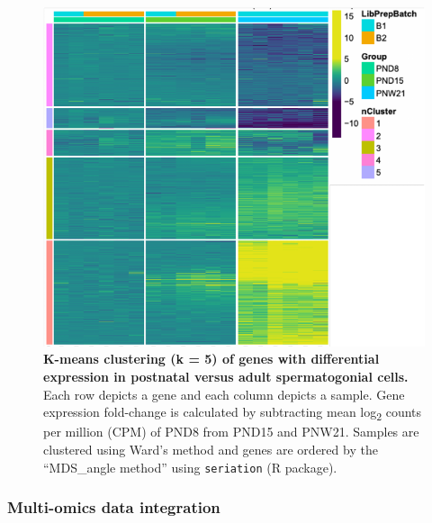 \documentclass[12pt,twoside]{reedthesis}
\begin{document}
\begin{figure}[htbp]

{\centering \includegraphics{thesis_files/figure-latex/dn3-1} 

}

\caption[K-means clustering of differentiallly expressed genes]{\textbf{K-means clustering (k = 5) of genes with differential expression in postnatal versus adult spermatogonial cells.}
Each row depicts a gene and each column depicts a sample. Gene
expression fold-change is calculated by subtracting mean
log\textsubscript{2} counts per million (CPM) of PND8 from PND15 and
PNW21. Samples are clustered using Ward's method and genes are ordered
by the ``MDS\_angle method'' using \texttt{seriation} (R package).}\label{fig:dn3}
\end{figure}
\hypertarget{multi-omics-data-integration-1}{%
\subsubsection{Multi-omics data integration}\label{multi-omics-data-integration-1}}
\end{document}
